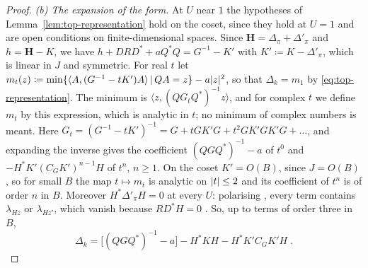 \documentclass[11pt]{preprint}
\DeclarePairedDelimiter{\abs}{\lvert}{\rvert}
\numberwithin{equation}{section}
\theoremstyle{definition}
\theoremstyle{remark}
\theoremstyle{plain}
\begin{document}
\begin{proof}
\emph{(b) The expansion of the form.} At $U$ near $1$ the hypotheses of Lemma~\ref{lem:top-representation} hold on the coset, since they hold at $U = 1$ and are open conditions on finite-dimensional spaces. Since $\mathbf H = \Delta_\pi + \Delta'_\pi$ and $h = \mathbf H - K$, we have $h + DRD^* + aQ^*Q = G^{-1} - K'$ with $K' \coloneqq K - \Delta'_\pi$, which is linear in $J$ and symmetric. For real $t$ let $m_t(z) \coloneqq \min\{ \langle A, (G^{-1} - tK')A \rangle \, | \, QA = z \} - a\abs{z}^2$, so that $\Delta_k = m_1$ by \eqref{eq:top-representation}. The minimum is $\langle z, (QG_tQ^*)^{-1}z \rangle$, and for complex $t$ we define $m_t$ by this expression, which is analytic in $t$; no minimum of complex numbers is meant. Here $G_t = (G^{-1} - tK')^{-1} = G + tGK'G + t^2GK'GK'G + \dots$, and expanding the inverse gives the coefficient $(QGQ^*)^{-1} - a$ of $t^0$ and $-H^*K'(C_GK')^{n-1}H$ of $t^n$, $n \geq 1$. On the coset $K' = O(B)$, since $J = O(B)$, so for small $B$ the map $t \mapsto m_t$ is analytic on $\abs{t} \leq 2$ and its coefficient of $t^n$ is of order $n$ in $B$. Moreover $H^*\Delta'_\pi H = 0$ at every $U$: polarising \cite[(3.120)]{BalabanPBG}, every term contains $\lambda_{Hz}$ or $\lambda_{Hz'}$, which vanish because $RD^*H = 0$ \cite[(3.124), p.~420]{BalabanPBG}. So, up to terms of order three in $B$,
\begin{equation}\label{eq:top-expansion}
    \Delta_k = \bigl[(QGQ^*)^{-1} - a\bigr] - H^*KH - H^*K'C_GK'H\;.
\end{equation}


\end{proof}
\end{document}
